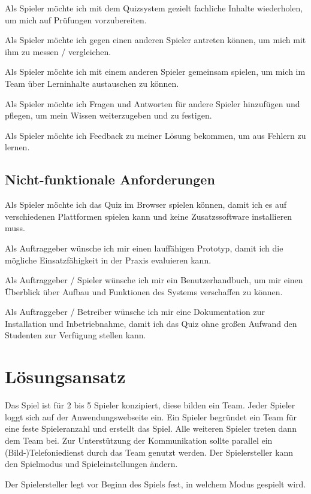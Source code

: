 \documentclass[a4paper,11pt,listof=numbered,glossary=totoc,parskip=half,toc=bib]{scrreprt}
\begin{document}
{Als Spieler möchte ich mit dem Quizsystem gezielt fachliche Inhalte wiederholen, um mich auf Prüfungen vorzubereiten.

Als Spieler möchte ich gegen einen anderen Spieler antreten können, um mich mit ihm zu messen / vergleichen.

Als Spieler möchte ich mit einem anderen Spieler gemeinsam spielen, um mich im Team über Lerninhalte austauschen zu können.

Als Spieler möchte ich Fragen und Antworten für andere Spieler hinzufügen und pflegen, um mein Wissen weiterzugeben und zu festigen.

Als Spieler möchte ich Feedback zu meiner Lösung bekommen, um aus Fehlern zu lernen.


\subsection{Nicht-funktionale Anforderungen}

Als Spieler möchte ich das Quiz im Browser spielen können, damit ich es auf verschiedenen Plattformen spielen kann und keine Zusatzssoftware installieren muss.

Als Auftraggeber wünsche ich mir einen lauffähigen Prototyp, damit ich die mögliche Einsatzfähigkeit in der Praxis evaluieren kann.

Als Auftraggeber / Spieler wünsche ich mir ein Benutzerhandbuch, um mir einen Überblick über Aufbau und Funktionen des Systems verschaffen zu können.

Als Auftraggeber / Betreiber wünsche ich mir eine Dokumentation zur Installation und Inbetriebnahme, damit ich das Quiz ohne großen Aufwand den Studenten zur Verfügung stellen kann.

	\newpage
	
	\section{Lösungsansatz}

Das Spiel ist für 2 bis 5 Spieler konzipiert, diese bilden ein Team.
Jeder Spieler loggt sich auf der Anwendungswebseite ein. Ein Spieler begründet ein Team für eine feste Spieleranzahl und erstellt das Spiel. Alle weiteren Spieler treten dann dem Team bei. Zur Unterstützung der Kommunikation sollte parallel ein (Bild-)Telefoniedienst durch das Team genutzt werden. Der Spielersteller kann den Spielmodus und Spieleinstellungen ändern.

Der Spielersteller legt vor Beginn des Spiels fest, in welchem Modus gespielt wird.

}
\end{document}
